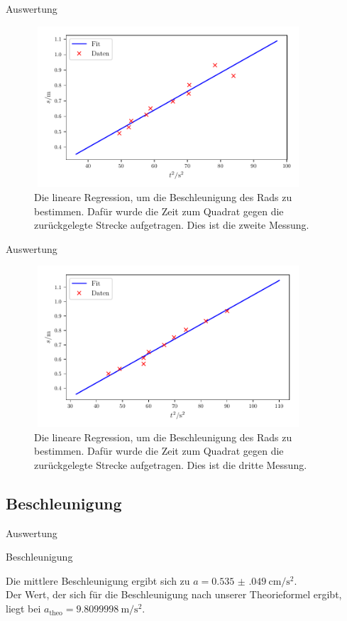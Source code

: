 \begin{frame}{Auswertung}
    \begin{figure}   
    
    \centering
    \includegraphics[width=10cm, height=6cm]{build/plot2b.pdf}
    \caption{Die lineare Regression, um die Beschleunigung des Rads zu bestimmen. Dafür wurde die Zeit zum Quadrat gegen die zurückgelegte Strecke aufgetragen. Dies ist die zweite Messung.} 

    \label{fig:plot2b}
\end{figure}
\end{frame}

\begin{frame}{Auswertung}
    \begin{figure}   
    
    \centering
    \includegraphics[width=10cm, height=6cm]{build/plot3b.pdf}
    \caption{Die lineare Regression, um die Beschleunigung des Rads zu bestimmen. Dafür wurde die Zeit zum Quadrat gegen die zurückgelegte Strecke aufgetragen. Dies ist die dritte Messung.} 

    \label{fig:plot3b}
\end{figure}
\end{frame}

\subsection{Beschleunigung}
\begin{frame}{Auswertung}
    \begin{block}{Beschleunigung}
        
        Die mittlere Beschleunigung ergibt sich zu $a = \SI{0.535(049)}{\centi\meter\per\second\squared}$.
        \\Der Wert, der sich für die Beschleunigung nach unserer Theorieformel ergibt, liegt bei $a_\text{theo}= \SI{9.8099998}{\meter\per\second\squared}$.
    \end{block}
\end{frame}
    
